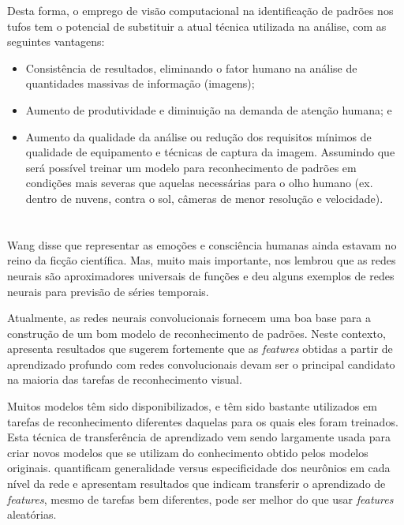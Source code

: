 \documentclass[12pt, a4paper]{article}
\begin{document}
Desta forma, o emprego de visão computacional na identificação de padrões nos tufos tem o potencial de substituir a atual técnica utilizada na análise, com as seguintes vantagens:
\begin{itemize}
    \item Consistência de resultados, eliminando o fator humano na análise de quantidades massivas de informação (imagens);
    \item Aumento de produtividade e diminuição na demanda de atenção humana; e
    \item Aumento da qualidade da análise ou redução dos requisitos mínimos de qualidade de equipamento e técnicas de captura da imagem. Assumindo que será possível treinar um modelo para reconhecimento de padrões em condições mais severas que aquelas necessárias para o olho humano (ex. dentro de nuvens, contra o sol, câmeras de menor resolução e velocidade).
\end{itemize}


\section{\sectionII}
\label{sec:rel-work}

Wang \cite{Wang2003} disse que representar as emoções e consciência humanas ainda estavam no reino da ficção científica. Mas, muito mais importante, nos lembrou que as redes neurais são aproximadores universais de funções e deu alguns exemplos de redes neurais para previsão de séries temporais.

Atualmente, as redes neurais convolucionais fornecem uma boa base para a construção de um bom modelo de reconhecimento de padrões. Neste contexto, \cite{Razavian2014} apresenta resultados que sugerem fortemente que as \emph{features} obtidas a partir de aprendizado profundo com redes convolucionais devam ser o principal candidato na maioria das tarefas de reconhecimento visual.

Muitos modelos têm sido disponibilizados, e têm sido bastante utilizados em tarefas de reconhecimento diferentes daquelas para os quais eles foram treinados. Esta técnica de transferência de aprendizado vem sendo largamente usada para criar novos modelos que se utilizam do conhecimento obtido pelos modelos originais. \cite{Yosinski2014} quantificam generalidade versus especificidade dos neurônios em cada nível da rede e apresentam resultados que indicam transferir o aprendizado de \emph{features}, mesmo de tarefas bem diferentes, pode ser melhor do que usar \emph{features} aleatórias.
\end{document}
